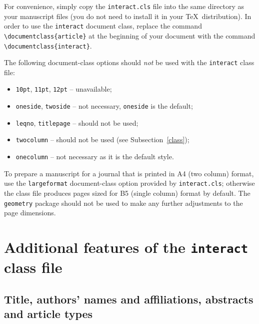 \documentclass[]{interact}
\theoremstyle{plain}%
\theoremstyle{definition}
\theoremstyle{remark}
\begin{document}
For convenience, simply copy the \texttt{interact.cls} file into the same directory as your manuscript files (you do not need to install it in your \TeX\ distribution). In order to use the \texttt{interact} document class, replace the command \verb"\documentclass{article}" at the beginning of your document with the command \verb"\documentclass{interact}".

The following document-class options should \emph{not} be used with the \texttt{interact} class file:
\begin{itemize}
  \item \texttt{10pt}, \texttt{11pt}, \texttt{12pt} -- unavailable;
  \item \texttt{oneside}, \texttt{twoside} -- not necessary, \texttt{oneside} is the default;
  \item \texttt{leqno}, \texttt{titlepage} -- should not be used;
  \item \texttt{twocolumn} -- should not be used (see Subsection~\ref{class});
  \item \texttt{onecolumn} -- not necessary as it is the default style.
\end{itemize}
To prepare a manuscript for a journal that is printed in A4 (two column) format, use the \verb"largeformat" document-class option provided by \texttt{interact.cls}; otherwise the class file produces pages sized for B5 (single column) format by default. The \texttt{geometry} package should not be used to make any further adjustments to the page dimensions.



\section{Additional features of the \texttt{interact} class file}

\subsection{Title, authors' names and affiliations, abstracts and article types}
\end{document}
